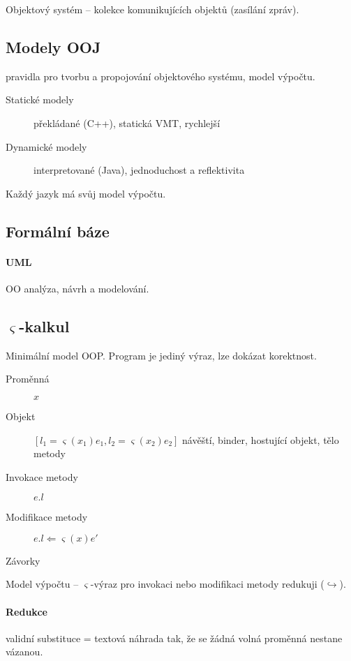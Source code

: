 \documentclass[a4paper, 11pt]{report}
\begin{document}
Objektový systém -- kolekce komunikujících objektů (zasílání zpráv).

\subsection{Modely OOJ}
pravidla pro tvorbu a propojování objektového systému, model výpočtu.

\begin{description}
	\item[Statické modely] překládané (C++), statická VMT, rychlejší
	\item[Dynamické modely] interpretované (Java), jednoduchost a reflektivita
\end{description}

Každý jazyk má svůj model výpočtu.

\subsection{Formální báze}

\paragraph{UML}
OO analýza, návrh a modelování.

\subsection{$\varsigma$-kalkul}
Minimální model OOP. Program je jediný výraz, lze dokázat korektnost.
\begin{description}
	\item[Proměnná] $x$
	\item[Objekt] $[l_1 = \varsigma(x_1)e_1, l_2 = \varsigma(x_2)e_2]$ návěští, binder, hostující objekt, tělo metody
	\item[Invokace metody] $e.l$
	\item[Modifikace metody] $e.l \Leftarrow \varsigma(x)e'$
	\item[Závorky]
\end{description}

Model výpočtu -- $\varsigma$-výraz pro invokaci nebo modifikaci metody redukuji ($\hookrightarrow$).

\paragraph{Redukce}
validní substituce = textová náhrada tak, že se žádná volná proměnná nestane vázanou.
\end{document}

